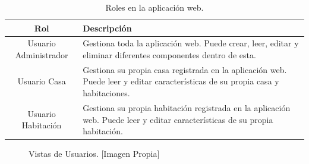 \begin{table}
	\begin{center}
		\caption{Roles en la aplicación web.}
		\label{table:roles}
		\begin{tabular}{|c|p{5cm}|}
			\hline 
			\textbf{Rol} & \textbf{Descripción} \\ 
			\hline 
			Usuario Administrador & Gestiona toda la aplicación web. Puede crear, leer, editar y eliminar diferentes componentes dentro de esta.\\ 
			\hline 
			Usuario Casa & Gestiona su propia casa registrada en la aplicación web. Puede leer y editar características de su propia casa y habitaciones.\\ 
			\hline 
			Usuario Habitación & Gestiona su propia habitación registrada en la aplicación web. Puede leer y editar características de su propia habitación.\\ 
			\hline 
		\end{tabular} 
	\end{center}
\end{table}

\begin{figure}[!t]
	\centering
	\caption[Vistas de Usuarios.]{Vistas de Usuarios. [Imagen Propia]}
	\label{fig:views}
\end{figure}

